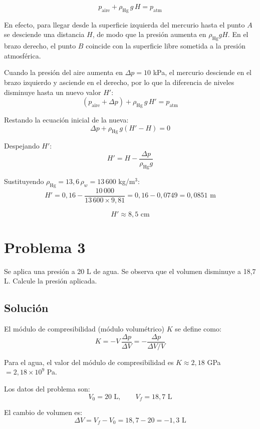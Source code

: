 \documentclass[a4paper]{article}
\begin{document}


$$
p_{\text{aire}} + \rho_{\text{Hg}}\, g\, H = p_{\text{atm}}
$$

En efecto, para llegar desde la superficie izquierda del mercurio hasta el punto $A$ se desciende una distancia $H$, de modo que la presión aumenta en $\rho_{\text{Hg}}gH$. En el brazo derecho, el punto $B$ coincide con la superficie libre sometida a la presión atmosférica.

Cuando la presión del aire aumenta en $\Delta p = 10$ kPa, el mercurio desciende en el brazo izquierdo y asciende en el derecho, por lo que la diferencia de niveles disminuye hasta un nuevo valor $H'$:
$$
\left(p_{\text{aire}} + \Delta p\right) + \rho_{\text{Hg}}\, g\, H' = p_{\text{atm}}
$$

Restando la ecuación inicial de la nueva:
$$
\Delta p + \rho_{\text{Hg}}\, g\left(H' - H\right) = 0
$$

Despejando $H'$:
$$
H' = H - \frac{\Delta p}{\rho_{\text{Hg}}g}
$$

Sustituyendo $\rho_{\text{Hg}} = 13{,}6\,\rho_w = 13\,600$ kg/m$^3$:
$$
H' = 0{,}16 - \frac{10\,000}{13\,600 \times 9{,}81}
    = 0{,}16 - 0{,}0749
    = 0{,}0851 \text{ m}
$$

$$
\boxed{H' \approx 8{,}5 \text{ cm}}
$$

\section{Problema 3}
Se aplica una presión a 20 L de agua. Se observa que el volumen disminuye a 18{,}7 L. Calcule la presión aplicada.



\subsection{Solución}

El módulo de compresibilidad (módulo volumétrico) $K$ se define como:
$$
K = -V\,\frac{\Delta p}{\Delta V} = -\frac{\Delta p}{\Delta V / V}
$$

Para el agua, el valor del módulo de compresibilidad es $K \approx 2{,}18$ GPa $= 2{,}18 \times 10^9$ Pa.

Los datos del problema son:
$$
V_0 = 20 \text{ L}, \qquad V_f = 18{,}7 \text{ L}
$$

El cambio de volumen es:
$$
\Delta V = V_f - V_0 = 18{,}7 - 20 = -1{,}3 \text{ L}
$$
\end{document}
